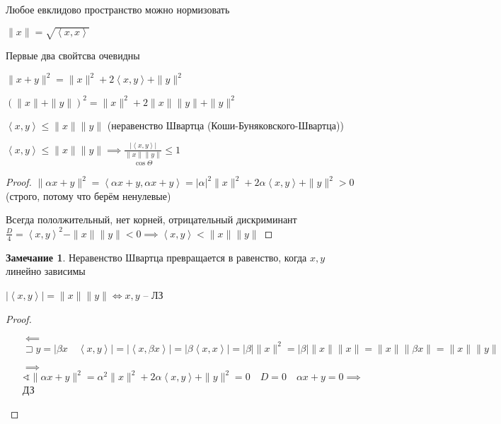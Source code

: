\documentclass{book}
\theoremstyle{definition}
\newtheorem*{note}{Замечание}
\begin{document}
\begin{lemma}
    Любое евклидово пространство можно нормизовать

    $\|x\| = \sqrt{\left<x, x \right>} $

    Первые два свойтсва очевидны

    $\|x+y\|^2 = \|x\|^2 + 2\left<x, y \right> + \|y\|^2$

    $\left( \|x\| + \|y\| \right) ^2 = \|x\|^2 + 2\|x\| \|y\| + \|y\|^2$

    $\left<x, y \right> \leqslant  \|x\| \|y\|$ (неравенство Швартца (Коши-Буняковского-Швартца))
\end{lemma}

\begin{lemma}

    $\left<x, y \right>\leqslant \|x\|\|y\| \implies \underset{\cos \Theta}{\frac{|\left<x, y \right>|}{\|x\|\|y\|}} \leqslant 1$
\end{lemma}
\begin{proof}
    $\|\alpha x + y\|^2 = \left<\alpha x + y, \alpha x + y \right> = |\alpha|^2\|x\|^2 + 2\alpha \left<x, y \right> + \|y\|^2 > 0$ (строго, потому что берём ненулевые)

    Всегда пололжительный, нет корней, отрицательный дискриминант $\frac{D}{4} = \left<x, y \right>^2 - \|x\|\|y\| <0 \implies \left<x, y \right> < \|x\|\|y\|$
\end{proof}

\begin{note}
    Неравенство Швартца превращается в равенство, когда $x, y$  линейно зависимы

     $|\left<x, y \right>| = \|x\|\|y\| \iff x, y$ -- ЛЗ
\end{note}
\begin{proof}
    \begin{itemize}
        \item []
        \item [$\impliedby $] $\sqsupset y = |\beta x\quad \left<x, y \right>| = |\left<x, \beta x \right>| = |\beta\left<x, x \right>| = |\beta| \|x\|^2 = |\beta| \|x\|\|x\| = \|x\| \|\beta x\| = \|x\| \|y\| $
        \item [$\implies $] $\sphericalangle \|\alpha x + y\|^2  = \alpha^2 \|x\|^2 + 2\alpha \left<x, y \right> + \|y\|^2 = 0\quad D = 0\quad \alpha x + y = 0 \implies $ ДЗ

    \end{itemize}
\end{proof}
\end{document}
